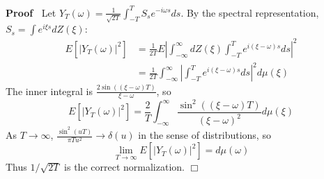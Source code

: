 \documentclass{article}
\newenvironment{proof}{\noindent\textbf{Proof\ }}{\hspace*{\fill}$\Box$\medskip}
\begin{document}
\begin{proof}
  Let $Y_T(\omega) = \frac{1}{\sqrt{2T}} \int_{-T}^T S_s e^{-i\omega s} ds$. By the spectral representation, $S_s = \int e^{i\xi s} dZ(\xi)$:
  \begin{align}
    E\left[|Y_T(\omega)|^2\right] &= \frac{1}{2T} E\left|\int_{-\infty}^\infty dZ(\xi) \int_{-T}^T e^{i(\xi-\omega)s} ds\right|^2\\
    &= \frac{1}{2T} \int_{-\infty}^\infty \left|\int_{-T}^T e^{i(\xi-\omega)s} ds\right|^2 d\mu(\xi)
  \end{align}
  The inner integral is $\frac{2\sin((\xi-\omega)T)}{\xi-\omega}$, so
  \begin{equation}
    E\left[|Y_T(\omega)|^2\right] = \frac{2}{T} \int_{-\infty}^\infty \frac{\sin^2((\xi-\omega)T)}{(\xi-\omega)^2} d\mu(\xi)
  \end{equation}
  As $T\to\infty$, $\frac{\sin^2(uT)}{\pi T u^2} \to \delta(u)$ in the sense of distributions, so
  \begin{equation}
    \lim_{T\to\infty} E\left[|Y_T(\omega)|^2\right] = d\mu(\omega)
  \end{equation}
  Thus $1/\sqrt{2T}$ is the correct normalization.
\end{proof}
\end{document}
